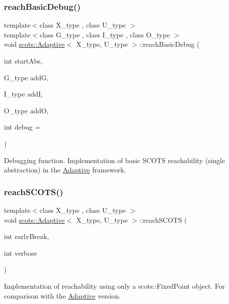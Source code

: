 \subsubsection{\texorpdfstring{reach\+Basic\+Debug()}{reachBasicDebug()}}
{\footnotesize\ttfamily template$<$class X\+\_\+type , class U\+\_\+type $>$ \\
template$<$class G\+\_\+type , class I\+\_\+type , class O\+\_\+type $>$ \\
void \hyperlink{classscots_1_1Adaptive}{scots\+::\+Adaptive}$<$ X\+\_\+type, U\+\_\+type $>$\+::reach\+Basic\+Debug (\begin{DoxyParamCaption}\item[{int}]{start\+Abs,  }\item[{G\+\_\+type}]{addG,  }\item[{I\+\_\+type}]{addI,  }\item[{O\+\_\+type}]{addO,  }\item[{int}]{debug = {} }\end{DoxyParamCaption})\hspace{0.3cm}{\ttfamily [inline]}}

Debugging function. Implementation of basic S\+C\+O\+TS reachability (single abstraction) in the \hyperlink{classscots_1_1Adaptive}{Adaptive} framework. \mbox{\label{classscots_1_1Adaptive_aed4f1976c5a2f538c07becbde46381e4}} 
\subsubsection{\texorpdfstring{reach\+S\+C\+O\+T\+S()}{reachSCOTS()}}
{\footnotesize\ttfamily template$<$class X\+\_\+type , class U\+\_\+type $>$ \\
void \hyperlink{classscots_1_1Adaptive}{scots\+::\+Adaptive}$<$ X\+\_\+type, U\+\_\+type $>$\+::reach\+S\+C\+O\+TS (\begin{DoxyParamCaption}\item[{int}]{early\+Break,  }\item[{int}]{verbose }\end{DoxyParamCaption})\hspace{0.3cm}{\ttfamily [inline]}}

Implementation of reachability using only a scots\+::\+Fixed\+Point object. For comparison with the \hyperlink{classscots_1_1Adaptive}{Adaptive} version. \mbox{\label{classscots_1_1Adaptive_a76d026d45bd794eba3ef69c18835dd54}} 
